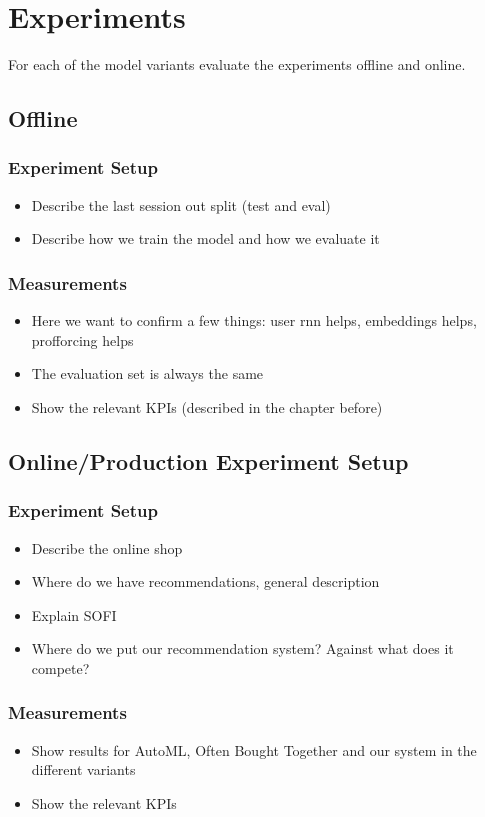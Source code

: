 \chapter{Experiments}
For each of the model variants evaluate the experiments offline and online.
\section{Offline}
\subsection{Experiment Setup}
\begin{itemize}
    \item Describe the last session out split (test and eval)
    \item Describe how we train the model and how we evaluate it
\end{itemize}
\subsection{Measurements}
\begin{itemize}
    \item Here we want to confirm a few things: user rnn helps, embeddings helps, profforcing helps
    \item The evaluation set is always the same
    \item Show the relevant KPIs (described in the chapter before)
\end{itemize}

\section{Online/Production Experiment Setup}
\subsection{Experiment Setup}
\begin{itemize}
    \item Describe the online shop
    \item Where do we have recommendations, general description
    \item Explain SOFI
    \item Where do we put our recommendation system? Against what does it compete?
\end{itemize}
\subsection{Measurements}
\begin{itemize}
    \item Show results for AutoML, Often Bought Together and our system in the different variants
    \item Show the relevant KPIs
\end{itemize}
